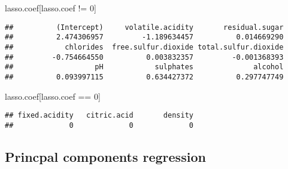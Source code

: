 \documentclass[
]{article}
\newenvironment{Shaded}{\begin{snugshade}}{\end{snugshade}}
\newcommand{\DecValTok}[1]{\textcolor[rgb]{0.00,0.00,0.81}{#1}}
\newcommand{\FunctionTok}[1]{\textcolor[rgb]{0.00,0.00,0.00}{#1}}
\newcommand{\NormalTok}[1]{#1}
\newcommand{\OtherTok}[1]{\textcolor[rgb]{0.56,0.35,0.01}{#1}}
\newcommand{\SpecialCharTok}[1]{\textcolor[rgb]{0.00,0.00,0.00}{#1}}
\begin{document}
\begin{Shaded}
\begin{Highlighting}[]
\NormalTok{lasso.coef[lasso.coef }\SpecialCharTok{!=} \DecValTok{0}\NormalTok{]}
\end{Highlighting}
\end{Shaded}

\begin{verbatim}
##          (Intercept)     volatile.acidity       residual.sugar 
##          2.474306957         -1.189634457          0.014669290 
##            chlorides  free.sulfur.dioxide total.sulfur.dioxide 
##         -0.754664550          0.003832357         -0.001368393 
##                   pH            sulphates              alcohol 
##          0.093997115          0.634427372          0.297747749
\end{verbatim}

\begin{Shaded}
\begin{Highlighting}[]
\NormalTok{lasso.coef[lasso.coef }\SpecialCharTok{==} \DecValTok{0}\NormalTok{]}
\end{Highlighting}
\end{Shaded}

\begin{verbatim}
## fixed.acidity   citric.acid       density 
##             0             0             0
\end{verbatim}

\hypertarget{princpal-components-regression}{%
\subsection{Princpal components
regression}\label{princpal-components-regression}}

\begin{Shaded}
\end{Shaded}
\end{document}
